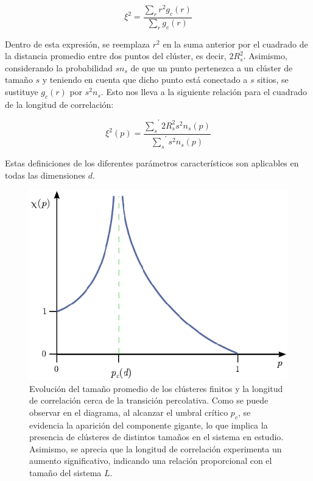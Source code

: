 \begin{equation}\label{eq:17}
\xi^2=\frac{\sum_r{r^2g_c(r)}}{\sum_r{g_c(r)}}
\end{equation}

Dentro de esta expresión, se reemplaza $r^2$  en la suma anterior por el cuadrado de la distancia promedio entre dos puntos del clúster, es decir, $2R_{s}^2$. Asimismo, considerando la probabilidad $sn_s$ de que un punto pertenezca a un clúster de tamaño $s$ y teniendo en cuenta que dicho punto está conectado a $s$ sitios, se sustituye $g_c(r)$ por $s^2n_s$. Esto nos lleva a la siguiente relación para el cuadrado de la longitud de correlación:

\begin{equation}\label{eq:18}
	\xi^2(p)=\frac{{\sum_s}^{\prime}{2R_{s}^2s^2n_s(p)}}{{\sum_{s}}^{\prime}{s^2n_s(p)}}
\end{equation}

Estas definiciones de los diferentes parámetros característicos son aplicables en todas las dimensiones $d$.



\begin{figure}[ht]
	\centering\includegraphics[width=\imsize]{promedio.png}
	\caption[Evolución del tamaño promedio de los clústeres finitos y la longitud de correlación cerca de la transición percolativa.]{ Evolución del tamaño promedio de los clústeres finitos y la longitud de correlación cerca de la transición percolativa. Como se puede observar en el diagrama, al alcanzar el umbral crítico $p_c$, se evidencia la aparición del componente gigante, lo que implica la presencia de clústeres de distintos tamaños en el sistema en estudio. Asimismo, se aprecia que la longitud de correlación experimenta un aumento significativo, indicando una relación proporcional con el tamaño del sistema $L$.}\label{fig:promedio}
\end{figure}


